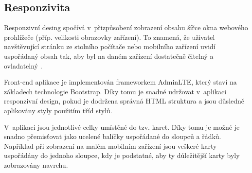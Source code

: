 \documentclass[czech,BP]{thesiskiv}
\begin{document}
	\subsection{Responzivita}
	\par Responzivní desing spočívá v~přizpůsobení zobrazení obsahu šířce okna webového prohlížeče (příp. velikosti obrazovky zařízení). To znamená, že uživatel navštěvující stránku ze stolního počítače nebo mobilního zařízení uvidí uspořádaný obsah tak, aby byl na daném zařízení dostatečně čitelný a ovladatelný \cite{CSSOkamzite}.
	\par Front-end aplikace je implementován frameworkem AdminLTE, který staví na základech technologie Bootstrap. Díky tomu je snadné udržovat v~aplikaci responzivní design, pokud je dodržena správná HTML struktura a jsou důsledně aplikovány styly použitím tříd stylů. 
	\par V~aplikaci jsou jednotlivé celky umístěné do tzv. karet. Díky tomu je možné je snadno přemisťovat jako ucelené balíčky uspořádané do sloupců a řádků. Například při zobrazení na malém mobilním zařízení jsou veškeré karty uspořádány do jednoho sloupce, kdy je podstatné, aby ty důležitější karty byly zobrazovány navrchu.  
\end{document}
